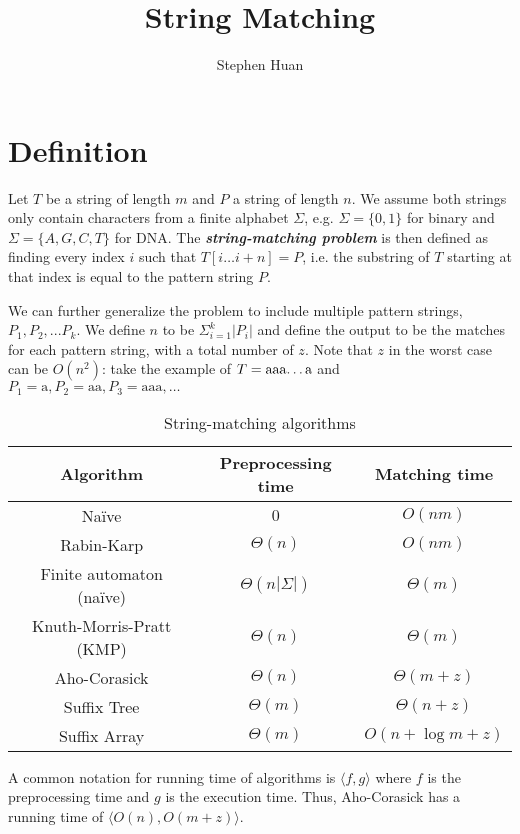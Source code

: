 \documentclass[11pt, oneside]{article}
\title{String Matching}
\author{Stephen Huan}
\begin{document}
\maketitle

\section{Definition}
Let \( T \) be a string of length \( m \) and \( P \) a string of length \( n \).
We assume both strings only contain characters from a finite alphabet \( \Sigma \),
e.g. \( \Sigma = \{ 0, 1 \} \) for binary and \( \Sigma = \{ A, G, C, T \} \) for DNA.
The \textbf{\textit{string-matching problem}} is then defined as finding every index \( i \)
such that \( T[i \dots i + n] = P \), i.e. the substring of \( T \) starting at that index is
equal to the pattern string \( P \).

We can further generalize the problem to include multiple pattern strings, \( P_1, P_2, ... P_k \). We define \( n \) to be \( \Sigma^{k}_{i = 1} |P_i| \) and define the output to be the matches for each pattern string, with a total number of \( z \). Note that \( z \) in the worst case can be
\( O(n^2) \): take the example of \( T = \text{aaa\dots a} \) and \( P_1 = \text{a}, P_2 = \text{aa}, P_3 = \text{aaa}, \dots \)

\begin{table}[h!]
\centering
\begin{tabular}{ ccc }
 Algorithm & Preprocessing time & Matching time \\
 \hline
 Naïve & \( 0 \) & \( O(nm) \) \\
 Rabin-Karp & \( \Theta(n) \) & \( O(nm) \) \\
 Finite automaton (naïve) & \( \Theta(n|\Sigma|) \) & \( \Theta(m) \) \\
 Knuth-Morris-Pratt (KMP) & \( \Theta(n) \) & \( \Theta(m) \) \\
 Aho-Corasick & \( \Theta(n) \) & \( \Theta(m + z) \) \\
 Suffix Tree & \( \Theta(m) \) & \( \Theta(n + z) \) \\
 Suffix Array & \( \Theta(m) \) & \( O(n + \log m + z) \) \\
 \hline
\end{tabular}
\caption{String-matching algorithms}
\end{table}

A common notation for running time of algorithms is \( \langle f, g \rangle \)
where \( f \) is the preprocessing time and \( g \) is the execution time. Thus, Aho-Corasick has a running time of \( \langle O(n), O(m + z) \rangle \).
\end{document}
